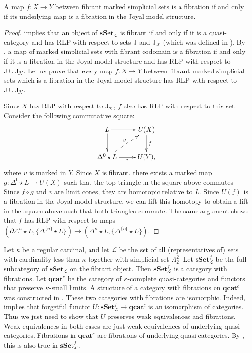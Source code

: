 \documentclass[reqno]{amsart}
\theoremstyle{definition}
\theoremstyle{remark}
\newcommand{\cat}[1]{\mathbf{#1}}
\newcommand{\sSet}{\cat{sSet}}
\newcommand{\qcat}{\cat{qcat}}
\newcommand{\join}{\star}
\newcommand{\J}{\mathrm{J}}
\numberwithin{figure}{section}
\begin{document}
\begin{prop}
A map $f : X \to Y$ between fibrant marked simplicial sets is a fibration if and only if its underlying map is a fibration in the Joyal model structure.
\end{prop}
\begin{proof}
 implies that an object of $\sSet_\mathcal{L}$ is fibrant if and only if it is a quasi-category
and has RLP with respect to sets $\J$ and $\J_\mathcal{K}$ (which was defined in ).
By \cite[Proposition~3.6]{f-model-structures}, a map of marked simplicial sets with fibrant codomain is a fibration
if and only if it is a fibration in the Joyal model structure and has RLP with respect to $\J \cup \J_\mathcal{K}$.
Let us prove that every map $f : X \to Y$ between fibrant marked simplicial sets which is a fibration in the Joyal model structure has RLP with respect to $\J \cup \J_\mathcal{K}$.

Since $X$ has RLP with respect to $\J_\mathcal{K}$, $f$ also has RLP with respect to this set.
Consider the following commutative square:
\[ \xymatrix{ L \ar[r] \ar[d] & U(X) \ar[d]^f \\
              \Delta^0 \join L \ar[r]_v \ar@{-->}[ur]^g & U(Y),
            } \]
where $v$ is marked in $Y$.
Since $X$ is fibrant, there exists a marked map $g : \Delta^0 \join L \to U(X)$ such that the top triangle in the square above commutes.
Since $f \circ g$ and $v$ are limit cones, they are homotopic relative to $L$.
Since $U(f)$ is a fibration in the Joyal model structure, we can lift this homotopy to obtain a lift in the square above such that both triangles commute.
The same argument shows that $f$ has RLP with respect to maps $(\partial \Delta^n \join L, \{ \Delta^{\{n\}} \join L \}) \to (\Delta^n \join L, \{ \Delta^{\{n\}} \join L \})$.
\end{proof}

Let $\kappa$ be a regular cardinal, and let $\mathcal{L}$ be the set of all (representatives of) sets with cardinality less than $\kappa$ together with simplicial set $\Lambda^2_2$.
Let $\sSet_\mathcal{L}^f$ be the full subcategory of $\sSet_\mathcal{L}$ on the fibrant object.
Then $\sSet_\mathcal{L}^f$ is a category with fibrations.
Let $\qcat^c$ be the category of $\kappa$-complete quasi-categories and functors that preserve $\kappa$-small limits.
A structure of a category with fibrations on $\qcat^c$ was constructed in \cite{szumilo}.
These two categories with fibrations are isomorphic.
Indeed,  implies that forgetful functor $U : \sSet_\mathcal{L}^f \to \qcat^c$ is an isomorphism of categories.
Thus we just need to show that $U$ preserves weak equivalences and fibrations.
Weak equivalences in both cases are just weak equivalences of underlying quasi-categories.
Fibrations in $\qcat^c$ are fibrations of underlying quasi-categories.
By , this is also true in $\sSet_\mathcal{L}^f$.



\end{document}
